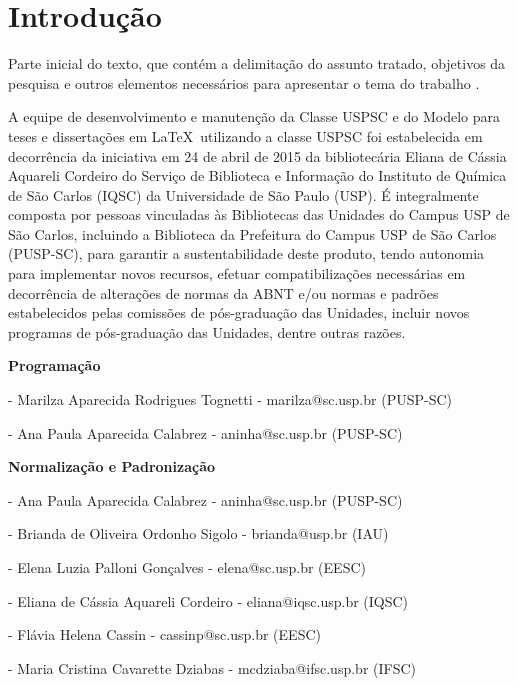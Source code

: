 
\chapter[Introdução]{Introdução}


Parte inicial do texto, que contém a delimitação do assunto tratado, objetivos da pesquisa e outros elementos necessários para apresentar o tema do trabalho \cite{sibi2009}.

A equipe de desenvolvimento e manutenção da Classe USPSC e do Modelo para teses e dissertações em \LaTeX\ utilizando a classe USPSC foi estabelecida em decorrência da iniciativa em 24 de abril de 2015 da bibliotecária Eliana de Cássia Aquareli Cordeiro do Serviço de Biblioteca e Informação do Instituto de Química de São Carlos (IQSC) da Universidade de São Paulo (USP). É integralmente composta por pessoas vinculadas às Bibliotecas das Unidades do Campus USP de São Carlos, incluindo a Biblioteca da Prefeitura do Campus USP de São Carlos (PUSP-SC), para garantir a sustentabilidade deste produto, tendo autonomia para implementar novos recursos, efetuar compatibilizações necessárias em decorrência de alterações de normas da ABNT e/ou normas e padrões estabelecidos pelas comissões de pós-graduação das Unidades, incluir novos programas de pós-graduação das Unidades, dentre outras razões. 

\textbf{Programação}

  - Marilza Aparecida Rodrigues Tognetti - marilza@sc.usp.br (PUSP-SC)
		
  - Ana Paula Aparecida Calabrez - aninha@sc.usp.br (PUSP-SC)
	
	
\textbf{Normalização e Padronização}

   - Ana Paula Aparecida Calabrez - aninha@sc.usp.br (PUSP-SC)
	
   - Brianda de Oliveira Ordonho Sigolo - brianda@usp.br (IAU)	
	
   - Elena Luzia Palloni Gonçalves - elena@sc.usp.br (EESC)	
	
   - Eliana de Cássia Aquareli Cordeiro - eliana@iqsc.usp.br (IQSC)	
	
   - Flávia Helena Cassin - cassinp@sc.usp.br (EESC)
	
   - Maria Cristina Cavarette Dziabas - mcdziaba@ifsc.usp.br (IFSC)
	
